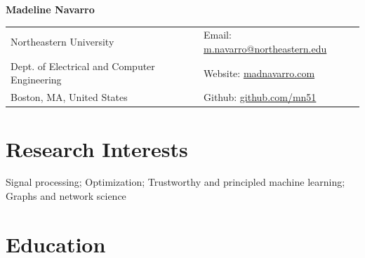 \documentclass[letterpaper,10pt]{article}
\begin{document}
\begin{center}
    \textbf{\huge Madeline Navarro} \\[.2cm]
    {
        \small
        \begin{tabularx}{\textwidth}{>{\raggedright\arraybackslash}X >{\raggedleft\arraybackslash}X}
                Northeastern University
                & 
                Email: \href{mailto:m.navarro@northeastern.edu}{m.navarro@northeastern.edu} 
                \\
                Dept. of Electrical and Computer Engineering
                & 
                Website: \href{https://madnavarro.com}{madnavarro.com}
                \\
                Boston, MA, United States
                & 
                Github: \href{https://github.com/mn51}{github.com/mn51}
            \end{tabularx}
    }
\end{center}

\section*{Research Interests}
\hspace{0.05in}
    Signal processing; Optimization; Trustworthy and principled machine learning; Graphs and network science

\section{Education}
\end{document}
